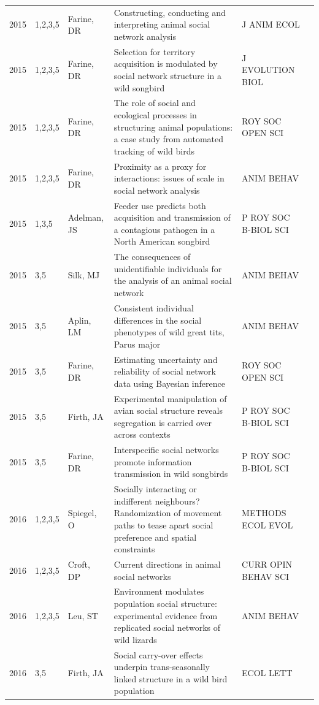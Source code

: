 \documentclass[11pt]{article} %
\begin{document}
\begin{longtable}{p{0.8cm}|p{1.25cm}|p{2.8cm}|p{7.5cm}|p{3cm}l}
2015&	1,2,3,5&	Farine, DR&	 Constructing, conducting and interpreting animal social network analysis&         	J ANIM ECOL\\
2015&	1,2,3,5&	Farine, DR&	 Selection for territory acquisition is modulated by social network structure in a wild songbird&         	J EVOLUTION BIOL\\
2015&	1,2,3,5&	Farine, DR&	 The role of social and ecological processes in structuring animal populations: a case study from automated tracking of wild birds&         	ROY SOC OPEN SCI\\
2015&	1,2,3,5&	Farine, DR&	 Proximity as a proxy for interactions: issues of scale in social network analysis&         	ANIM BEHAV\\
2015&	1,3,5&	Adelman, JS&	 Feeder use predicts both acquisition and transmission of a contagious pathogen in a North American songbird&         	P ROY SOC B-BIOL SCI\\
2015&	3,5&	Silk, MJ&	 The consequences of unidentifiable individuals for the analysis of an animal social network&         	ANIM BEHAV\\
2015&	3,5&	Aplin, LM&	 Consistent individual differences in the social phenotypes of wild great tits, Parus major&         	ANIM BEHAV\\
2015&	3,5&	Farine, DR&	 Estimating uncertainty and reliability of social network data using Bayesian inference&         	ROY SOC OPEN SCI\\
2015&	3,5&	Firth, JA&	 Experimental manipulation of avian social structure reveals segregation is carried over across contexts&         	P ROY SOC B-BIOL SCI\\
2015&	3,5&	Farine, DR&	 Interspecific social networks promote information transmission in wild songbirds&         	P ROY SOC B-BIOL SCI\\
2016&	1,2,3,5&	Spiegel, O&	 Socially interacting or indifferent neighbours? Randomization of movement paths to tease apart social preference and spatial constraints&         	METHODS ECOL EVOL\\
2016&	1,2,3,5&	Croft, DP&	 Current directions in animal social networks&         	CURR OPIN BEHAV SCI\\
2016&	1,2,3,5&	Leu, ST&	 Environment modulates population social structure: experimental evidence from replicated social networks of wild lizards&         	ANIM BEHAV\\
2016&	3,5&	Firth, JA&	 Social carry-over effects underpin trans-seasonally linked structure in a wild bird population&         	ECOL LETT\\

\end{longtable}
\end{document}

